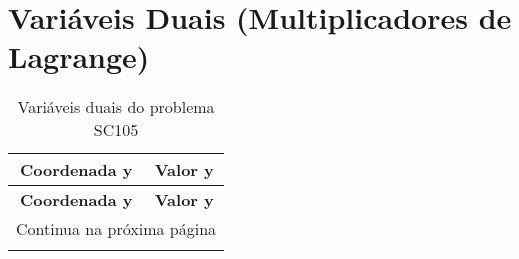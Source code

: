 \documentclass[12pt]{article}
\begin{document}
\section{Variáveis Duais (Multiplicadores de Lagrange)}

\begin{longtable}{@{}cc@{}}
\caption{Variáveis duais do problema SC105} \\
\toprule
\textbf{Coordenada y} & \textbf{Valor y} \\
\midrule
\endfirsthead

\toprule
\textbf{Coordenada y} & \textbf{Valor y} \\
\midrule
\endhead

\midrule \multicolumn{2}{r}{{Continua na próxima página}} \\ \midrule
\endfoot


\end{longtable}
\end{document}
